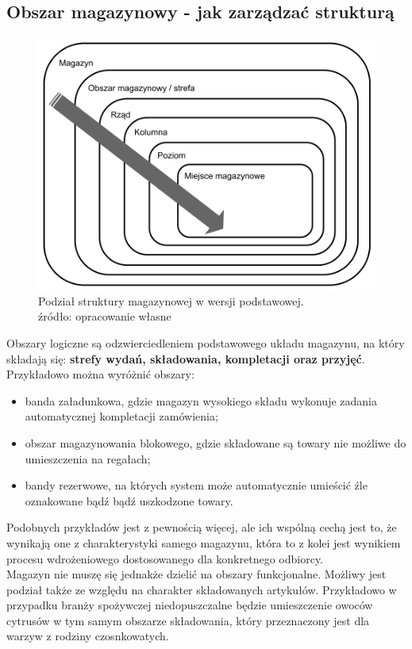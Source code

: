 	\subsection{Obszar magazynowy - jak zarządzać strukturą}	
		\begin{figure}[h]
			\centering
			\includegraphics[width=\textwidth]{images/unit_structure}
			\caption[Podstawowa struktura magazyny]{
					Podział struktury magazynowej w wersji podstawowej. \\
					źródło: opracowanie własne
			}
			\label{fig:c5:unit_structure}
		\end{figure}
		Obszary logiczne są odzwierciedleniem podstawowego układu magazynu, na który składają się:
		\textbf{strefy wydań, składowania, kompletacji oraz przyjęć}. Przykładowo można wyróżnić obszary:
		\begin{itemize}
			\item banda załadunkowa, gdzie magazyn wysokiego składu wykonuje zadania automatycznej kompletacji
			zamówienia;
			\item obszar magazynowania blokowego, gdzie składowane są towary nie możliwe do umieszczenia
			na regałach;
			\item bandy rezerwowe, na których system może automatycznie umieścić źle oznakowane bądź bądź
			uszkodzone towary.
		\end{itemize}
		Podobnych przykładów jest z pewnością więcej, ale ich wspólną cechą jest to, że wynikają one z 
		charakterystyki samego magazynu, która to z kolei jest wynikiem procesu wdrożeniowego dostosowanego
		dla konkretnego odbiorcy.\\
		Magazyn nie muszę się jednakże dzielić na obszary funkcjonalne. Możliwy jest podział także ze względu
		na charakter składowanych artykułów. Przykładowo w przypadku branży spożywczej niedopuszczalne będzie
		umieszczenie owoców cytrusów w tym samym obszarze składowania, który przeznaczony jest dla 
		warzyw z rodziny czosnkowatych.

